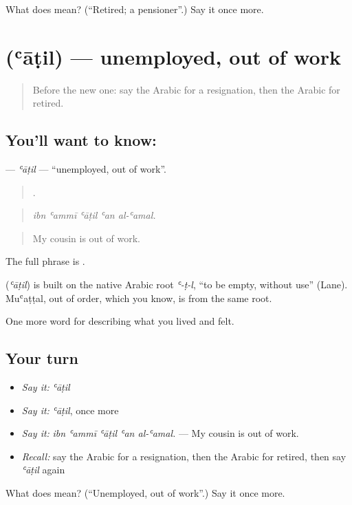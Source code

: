 \begin{tcolorbox}[breakable,colback=teal!4,colframe=teal!35!black,title={Before you move on}]
What does  mean? (\textquotedblleft{}Retired; a pensioner\textquotedblright{}.) Say it once more.
\end{tcolorbox}
\section[\texorpdfstring{\ar{عاطل} (ʿāṭil)}{عاطل (ʿāṭil)}]{ (ʿāṭil) — unemployed, out of work}

\label{lesson:AR-C522-atil}



\begin{quote}
Before the new one: say the Arabic for a resignation, then the Arabic for retired.
\end{quote}

\subsection*{You'll want to know: }
\textbf{} — \emph{ʿāṭil} — \textquotedblleft{}unemployed, out of work\textquotedblright{}.

\begin{quote}
    .
\end{quote}

\begin{quote}
\emph{ibn ʿammī ʿāṭil ʿan al-ʿamal.}
\end{quote}

\begin{quote}
My cousin is out of work.
\end{quote}

The full phrase is   .

\begin{cousinweb}
\textbf{} (\emph{ʿāṭil}) is built on the native Arabic root \emph{ʿ-ṭ-l}, \textquotedblleft{}to be empty, without use\textquotedblright{} (Lane). Muʿaṭṭal, out of order, which you know, is from the same root.
\end{cousinweb}

\begin{grammarlens}[title={What you've built}]
One more word for describing what you lived and felt.
\end{grammarlens}

\subsection*{Your turn}
\begin{itemize}
\raggedright
  \item \emph{Say it:} \emph{ʿāṭil}
  \item \emph{Say it:} \emph{ʿāṭil}, once more
  \item \emph{Say it:} \emph{ibn ʿammī ʿāṭil ʿan al-ʿamal.} — My cousin is out of work.
  \item \emph{Recall:} say the Arabic for a resignation, then the Arabic for retired, then say \emph{ʿāṭil} again
\end{itemize}

\begin{tcolorbox}[breakable,colback=teal!4,colframe=teal!35!black,title={Before you move on}]
What does  mean? (\textquotedblleft{}Unemployed, out of work\textquotedblright{}.) Say it once more.
\end{tcolorbox}

